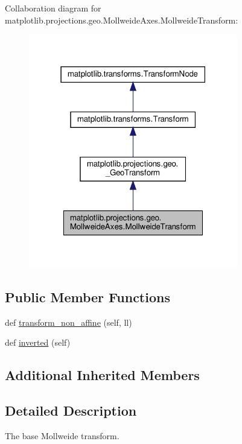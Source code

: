 Collaboration diagram for matplotlib.\+projections.\+geo.\+Mollweide\+Axes.\+Mollweide\+Transform\+:
\nopagebreak
\begin{figure}[H]
\begin{center}
\leavevmode
\includegraphics[width=259pt]{classmatplotlib_1_1projections_1_1geo_1_1MollweideAxes_1_1MollweideTransform__coll__graph}
\end{center}
\end{figure}
\subsection*{Public Member Functions}
\begin{DoxyCompactItemize}
\item 
def \hyperlink{classmatplotlib_1_1projections_1_1geo_1_1MollweideAxes_1_1MollweideTransform_a8219847380652be50059c0473e9578fe}{transform\+\_\+non\+\_\+affine} (self, ll)
\item 
def \hyperlink{classmatplotlib_1_1projections_1_1geo_1_1MollweideAxes_1_1MollweideTransform_a5ae8038e8bd7442190b89918b06551bc}{inverted} (self)
\end{DoxyCompactItemize}
\subsection*{Additional Inherited Members}


\subsection{Detailed Description}
\begin{DoxyVerb}The base Mollweide transform.\end{DoxyVerb}
 

